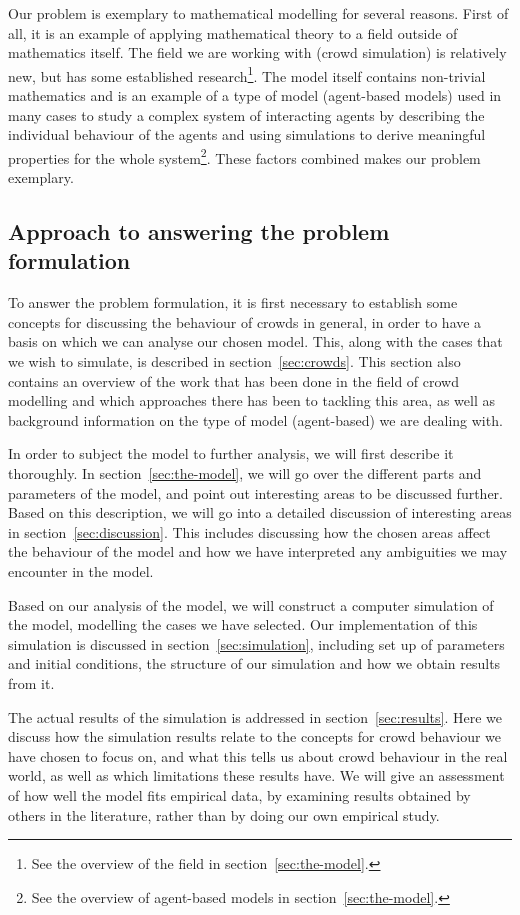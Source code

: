 Our problem is exemplary to mathematical modelling for several reasons. First 
of all, it is an example of applying mathematical theory to a field outside of 
mathematics itself. The field we are working with (crowd simulation) is 
relatively new, but has some established research\footnote{See the overview of 
the field in section~\ref{sec:the-model}.}. The model itself contains 
non-trivial mathematics and is an example of a type of model (agent-based 
models) used in many cases to study a complex system of interacting agents by 
describing the individual behaviour of the agents and using simulations to 
derive meaningful properties for the whole system\footnote{See the overview of 
agent-based models in section~\ref{sec:the-model}.}. These factors combined 
makes our problem exemplary.

\subsection{Approach to answering the problem formulation}
To answer the problem formulation, it is first necessary to establish some 
concepts for discussing the behaviour of crowds in general, in order to have a 
basis on which we can analyse our chosen model. This, along with the cases 
that we wish to simulate, is described in section~\ref{sec:crowds}. This 
section also contains an overview of the work that has been done in the field 
of crowd modelling and which approaches there has been to tackling this area, 
as well as background information on the type of model (agent-based) we are 
dealing with.

In order to subject the model to further analysis, we will first describe it 
thoroughly. In section~\ref{sec:the-model}, we will go over the different 
parts and parameters of the model, and point out interesting areas to be 
discussed further.  Based on this description, we will go into a detailed 
discussion of interesting areas in section~\ref{sec:discussion}.  This 
includes discussing how the chosen areas affect the behaviour of the model and 
how we have interpreted any ambiguities we may encounter in the model.

Based on our analysis of the model, we will construct a computer simulation of 
the model, modelling the cases we have selected. Our implementation of this 
simulation is discussed in section~\ref{sec:simulation}, including set up of 
parameters and initial conditions, the structure of our simulation and how we 
obtain results from it.

The actual results of the simulation is addressed in 
section~\ref{sec:results}. Here we discuss how the simulation results relate 
to the concepts for crowd behaviour we have chosen to focus on, and what this 
tells us about crowd behaviour in the real world, as well as which limitations 
these results have.  We will give an assessment of how well the model fits 
empirical data, by examining results obtained by others in the literature, 
rather than by doing our own empirical study.
